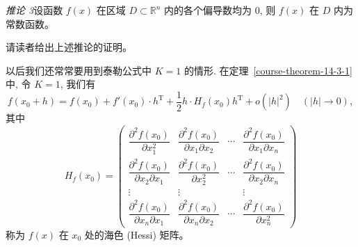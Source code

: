 \documentclass[UTF8,12pt,a4paper,fontset=fandol]{ctexart}
\begin{document}
\noindent\emph{推论 3}\quad 设函数 $f(x)$ 在区域 $D\subset\mathbb R^n$ 内的各个偏导数均为 0, 则 $f(x)$ 在 $D$ 内为常数函数。

请读者给出上述推论的证明。

以后我们还常常要用到泰勒公式中 $K=1$ 的情形. 在定理~\ref{course-theorem-14-3-1}  中, 令 $K=1$, 我们有
\[
  f(x_0+h)=f(x_0)+f'(x_0)\cdot h^\mathrm T
  +\frac12 h\cdot H_f(x_0)h^\mathrm T+o(|h|^2)
  \quad(|h|\to0),
\]
其中
\[
  H_f(x_0)=
  \begin{pmatrix}
    \dfrac{\partial^2 f(x_0)}{\partial x_1^2} &
    \dfrac{\partial^2 f(x_0)}{\partial x_1\partial x_2} &
    \cdots &
    \dfrac{\partial^2 f(x_0)}{\partial x_1\partial x_n}\\
    \dfrac{\partial^2 f(x_0)}{\partial x_2\partial x_1} &
    \dfrac{\partial^2 f(x_0)}{\partial x_2^2} &
    \cdots &
    \dfrac{\partial^2 f(x_0)}{\partial x_2\partial x_n}\\
    \vdots & \vdots & & \vdots\\
    \dfrac{\partial^2 f(x_0)}{\partial x_n\partial x_1} &
    \dfrac{\partial^2 f(x_0)}{\partial x_n\partial x_2} &
    \cdots &
    \dfrac{\partial^2 f(x_0)}{\partial x_n^2}
  \end{pmatrix}
\]
称为 $f(x)$ 在 $x_0$ 处的海色 (Hessi) 矩阵。
\end{document}
